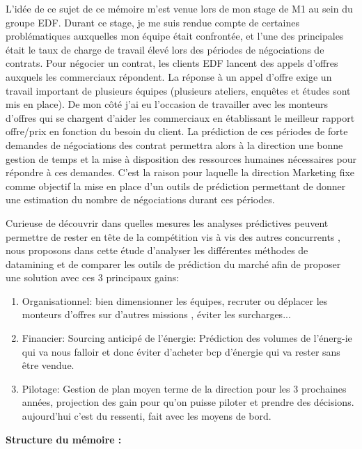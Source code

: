 \documentclass{article}
\begin{document}
L'idée de  ce sujet de ce mémoire m'est venue lors de mon stage de M1 au sein du groupe EDF. Durant ce stage, je me suis rendue compte de certaines problématiques auxquelles mon équipe était confrontée, et l'une des principales était le taux de charge de travail élevé lors des périodes de négociations de contrats.
Pour négocier un contrat, les clients EDF lancent des appels d’offres auxquels les commerciaux répondent.
La réponse à un appel d’offre exige un travail important de plusieurs équipes (plusieurs ateliers, enquêtes et études sont mis en place). De mon côté j’ai eu l’occasion de travailler avec les monteurs d’offres qui se chargent d’aider les commerciaux en établissant le meilleur rapport offre/prix en fonction du besoin du client.
La prédiction de ces périodes de forte demandes de négociations des contrat permettra alors à la direction une bonne gestion de temps et la mise à disposition des ressources humaines nécessaires pour répondre à ces demandes. C’est la raison pour laquelle la direction Marketing fixe comme objectif la mise en place d’un outils de prédiction permettant de donner une estimation du nombre de négociations durant ces périodes.

Curieuse de découvrir dans quelles mesures les analyses prédictives peuvent permettre de rester en tête de la compétition vis à vis des autres concurrents , nous proposons dans cette étude d’analyser les différentes méthodes de datamining et de comparer les outils de prédiction du marché afin de proposer une solution avec ces 3 principaux gains:
\begin{enumerate}
\item Organisationnel: bien dimensionner les équipes, recruter ou déplacer les monteurs d'offres sur d'autres missions , éviter les surcharges...

\item Financier: Sourcing anticipé de l'énergie: Prédiction des volumes de l'énerg-ie qui va nous falloir et donc éviter d'acheter bcp d'énergie qui va rester sans être vendue.

\item Pilotage: Gestion de plan moyen terme de la direction pour les 3 prochaines années, projection des gain pour qu'on puisse piloter et prendre des décisions. aujourd'hui c'est du ressenti, fait avec les moyens de bord.
\end{enumerate}
 
\vspace{0.5cm}
\textbf{Structure du mémoire :}
\vspace{0.5cm}
\end{document}
